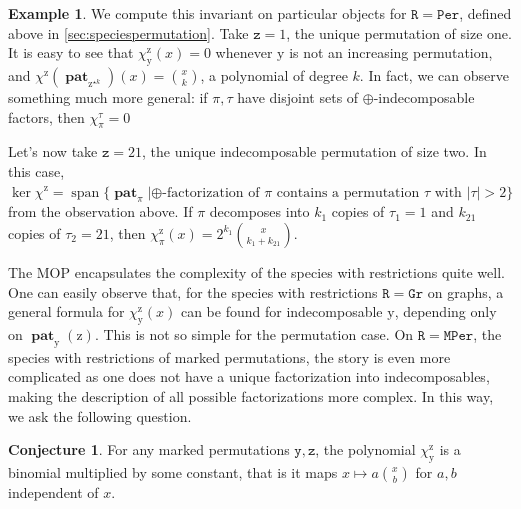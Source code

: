 \documentclass[12pt, reqno]{amsart}
\theoremstyle{definition}
\newtheorem{smpl}[thm]{Example}
\newtheorem{conj}[thm]{Conjecture}
\DeclareMathOperator{\pat}{\mathbf{pat}}
\DeclareMathOperator{\spn}{\mathrm{span}}
\begin{document}
\begin{smpl}
We compute this invariant on particular objects for $\mathtt{R} = \mathtt{Per}$, defined above in \cref{sec:speciespermutation}.
Take $\mathtt{z} = 1$, the unique permutation of size one.
It is easy to see that $\chi^{\mathrm{z}}_{\mathrm{y}}(x) = 0$ whenever $\mathrm{y}$ is not an increasing permutation, and $\chi^{\mathrm{z}}(\pat_{\mathrm{z}^{\star k}})(x) = \binom{x}{k}$, a polynomial of degree $k$.
In fact, we can observe something much more general: if $\pi, \tau$ have disjoint sets of $\oplus$-indecomposable factors, then $\chi^{\tau}_{\pi} = 0$

Let's now take $\mathtt{z} = 21$, the unique indecomposable permutation of size two.
In this case, $\ker \chi^{\mathrm{z}} = \spn \{ \pat_{\pi} | \text{$\oplus$-factorization of $\pi$ contains a permutation $\tau$ with $|\tau| > 2$} \}$ from the observation above.
If $\pi $ decomposes into $k_1$ copies of $\tau_1 = 1$ and $k_{21}$ copies of $\tau_2 = 21$, then $\chi^{\mathrm{z}}_{\pi}(x) = 2^{k_1} \binom{x}{k_1 + k_{21}}$.
\end{smpl}

The MOP encapsulates the complexity of the species with restrictions quite well.
One can easily observe that, for the species with restrictions $\mathtt{R} = \mathtt{Gr}$ on graphs, a general formula for $\chi^{\mathrm{z}}_{\mathrm{y}}(x)$ can be found for indecomposable $\mathrm{y}$, depending only on $\pat_{\mathrm{y}}(\mathrm{z})$.
This is not so simple for the permutation case.
On $\mathtt{R} = \mathtt{MPer}$, the species with restrictions of marked permutations, the story is even more complicated as one does not have a unique factorization into indecomposables, making the description of all possible factorizations more complex.
In this way, we ask the following question.

\begin{conj}
    For any marked permutations $\mathtt{y}, \mathtt{z}$, the polynomial $\chi^{\mathrm{z}}_{\mathrm{y}}$ is a binomial multiplied by some constant, that is it maps $x \mapsto a \binom{x}{b}$ for $a, b$ independent of $x$.
\end{conj}
\end{document}
